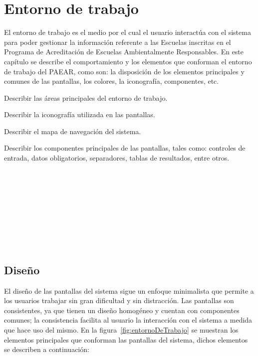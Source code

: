 
\section{Entorno de trabajo}

    El entorno de trabajo es el medio por el cual el usuario interactúa con el sistema para poder gestionar la información referente a las Escuelas inscritas en el Programa de Acreditación de Escuelas Ambientalmente Responsables. En este capítulo se describe el comportamiento y los elementos que conforman el entorno de 
    trabajo del PAEAR, como son: la disposición de los elementos principales y comunes de las pantallas, los colores, la iconografía, componentes, etc. \bigskip

    \begin{objetivos}
      \item Describir las áreas principales del entorno de trabajo.
      \item Describir la iconografía utilizada en las pantallas.
      \item Describir el mapa de navegación del sistema.
      \item Describir los componentes principales de las pantallas, tales como: controles de entrada, datos obligatorios, separadores, tablas de resultados, entre otros.
    \end{objetivos}
\\\\\\\\\\\\\\\\

\subsection{Diseño}

  El diseño de las pantallas del sistema sigue un enfoque minimalista que permite a los usuarios trabajar sin gran dificultad y sin distracción. 
  Las pantallas son consistentes, ya que tienen un diseño homogéneo y cuentan con componentes comunes; la consistencia facilita al usuario la interacción
  con el sistema a medida que hace uso del mismo. En la figura~\ref{fig:entornoDeTrabajo} se muestran los elementos principales que conforman las pantallas del sistema, 
  dichos elementos se describen a continuación:

